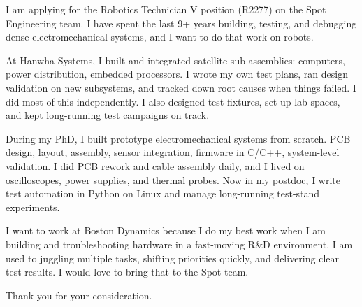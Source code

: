 \documentclass[letterpaper,11pt]{moderncv}
\date{\today}
\begin{document}
\makelettertitle

I am applying for the Robotics Technician V position (R2277) on the Spot Engineering team. I have spent the last 9+ years building, testing, and debugging dense electromechanical systems, and I want to do that work on robots.

At Hanwha Systems, I built and integrated satellite sub-assemblies: computers, power distribution, embedded processors. I wrote my own test plans, ran design validation on new subsystems, and tracked down root causes when things failed. I did most of this independently. I also designed test fixtures, set up lab spaces, and kept long-running test campaigns on track.

During my PhD, I built prototype electromechanical systems from scratch. PCB design, layout, assembly, sensor integration, firmware in C/C++, system-level validation. I did PCB rework and cable assembly daily, and I lived on oscilloscopes, power supplies, and thermal probes. Now in my postdoc, I write test automation in Python on Linux and manage long-running test-stand experiments.

I want to work at Boston Dynamics because I do my best work when I am building and troubleshooting hardware in a fast-moving R\&D environment. I am used to juggling multiple tasks, shifting priorities quickly, and delivering clear test results. I would love to bring that to the Spot team.

Thank you for your consideration.

\makeletterclosing
\end{document}
